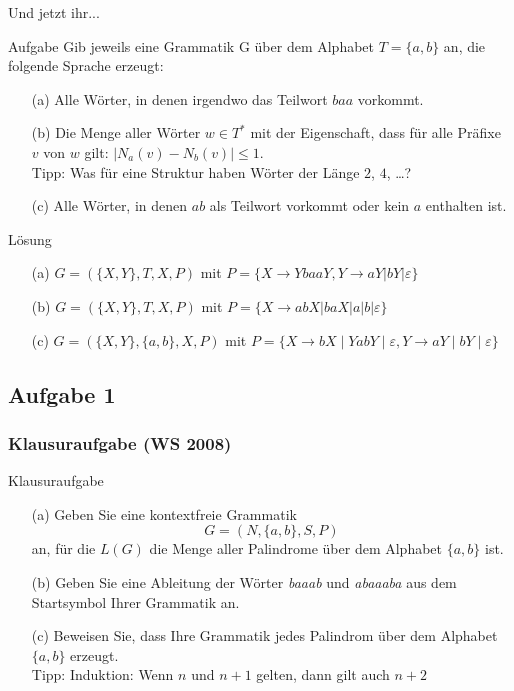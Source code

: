 \begin{frame}{Und jetzt ihr...}
\small
	\begin{exampleblock}{Aufgabe}
		Gib jeweils eine Grammatik G über dem Alphabet $T = \{a, b\}$ an, die folgende Sprache erzeugt:
		\begin{itemize}
				\item[(a)] Alle Wörter, in denen irgendwo das Teilwort $baa$ vorkommt.
				\item[(b)] Die Menge aller Wörter $w\in T^*$ mit der Eigenschaft, dass
						für alle Präfixe $v$ von $w$ gilt: $|N_a(v) - N_b(v)| \leq
						1$.\\
						Tipp: Was für eine Struktur haben Wörter der Länge $2$, $4$, \dots? \\
				\item[(c)] Alle Wörter, in denen $ab$ als Teilwort vorkommt oder kein $a$ enthalten ist.
			\end{itemize}	
	\end{exampleblock}
\pause
	\begin{block}{Lösung}
		\begin{itemize}
			\item[(a)] $G = (\{X,Y\},T,X,P)$ mit $P=\{X \to YbaaY, Y \to aY|bY|\varepsilon\}$
			\item[(b)] $G = (\{X,Y\},T,X,P)$ mit $P=\{X \to abX|baX|a|b|\varepsilon\}$
			\item[(c)] $G = (\{X, Y\}, \{a,b\}, X, P)$ mit $P = \{X \to bX \mid YabY \mid \varepsilon, Y \to aY \mid bY \mid \varepsilon\}$
		\end{itemize}
	\end{block}
\end{frame}


\subsection{Aufgabe 1}
\begin{frame}
	\frametitle{Klausuraufgabe (WS 2008)}
	\begin{exampleblock}{Klausuraufgabe}
	\begin{itemize}
		\item[(a)] Geben Sie eine kontextfreie Grammatik $$G = (N, \{a, b\}, S, P )$$ an, für die $L(G)$ die Menge aller Palindrome über dem Alphabet $\{a, b\}$ ist.
		\item[(b)] Geben Sie eine Ableitung der Wörter \emph{baaab} und \emph{abaaaba} aus dem Startsymbol Ihrer Grammatik an.
		\item[(c)] Beweisen Sie, dass Ihre Grammatik jedes Palindrom über dem Alphabet $\{a, b\}$ erzeugt.\\
		Tipp: Induktion: Wenn $n$ und $n+1$ gelten, dann gilt auch $n+2$
	\end{itemize}		
	\end{exampleblock}
\end{frame}

